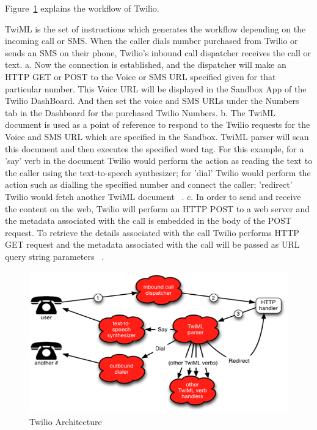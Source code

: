 Figure~\ref{f:architecture} explains the workflow of Twilio.
  

TwiML is the set of instructions which generates the workflow depending on the 
incoming call or SMS. When the caller dials number purchased from Twilio 
or sends an SMS on their phone, Twilio's inbound call dispatcher receives the 
call or text. 
a. Now the connection is established, and the dispatcher will make an HTTP GET 
or POST to the Voice or SMS URL specified given for that particular number. 
This Voice URL will be displayed in the Sandbox App of the Twilio DashBoard. 
And then set the voice and SMS URLs under the Numbers tab in the Dashboard for 
the purchased Twilio Numbers.
b. The TwiML document is used as a point of reference to respond to the Twilio 
requests for the Voice and SMS URL which are specified in the Sandbox. TwiML 
parser will scan this document and then executes the specified word tag. For 
this example, for a 'say' verb in the document Twilio would perform the action 
as reading the text to the caller using the text-to-speech synthesizer; for 
'dial' Twilio would perform the action such as dialling the specified number 
and connect the caller; 'redirect' Twilio would fetch another TwiML document
~\cite{hid-sp18-406-twilio-architecture2}.
c. In order to send and receive the content on the web, Twilio will perform an 
HTTP POST to a web server and the metadata associated with the call is embedded
in the body of the POST request. To retrieve the details associated with the 
call Twilio performs HTTP GET request and the metadata associated with the call
will be passed as URL query string parameters
~\cite{hid-sp18-406-twilio-architecture3}.


\begin{figure}[!ht]
  \centering\includegraphics[width=\columnwidth]{images/Twilio-Architecture.png}
  \caption{Twilio Architecture~\cite{hid-sp18-406-twilio-architecture-image}}
\label{f:architecture}
\end{figure}




